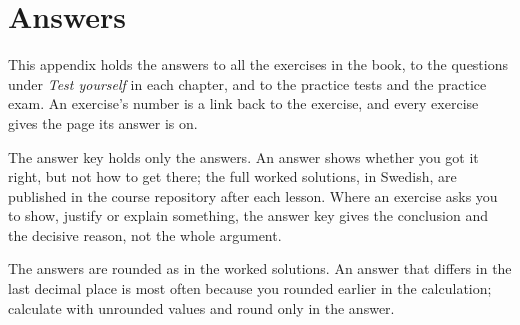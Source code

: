 
\chapter{Answers}
\label{facit:ch}

This appendix holds the answers to all the exercises in the book, to the questions under
\emph{Test yourself} in each chapter, and to the practice tests and the practice exam. An
exercise's number is a link back to the exercise, and every exercise gives the page its answer is
on.

The answer key holds only the answers. An answer shows whether you got it right, but not how to
get there; the full worked solutions, in Swedish, are published in the course repository after
each lesson. Where an exercise asks you to show, justify or explain something, the answer key
gives the conclusion and the decisive reason, not the whole argument.

The answers are rounded as in the worked solutions. An answer that differs in the last decimal
place is most often because you rounded earlier in the calculation; calculate with unrounded
values and round only in the answer.





















